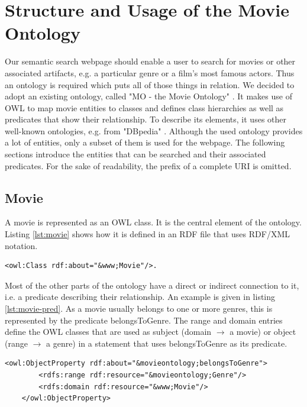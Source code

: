 \section{Structure and Usage of the Movie Ontology}
Our semantic search webpage should enable a user to search for movies or other associated artifacts, e.g. a particular genre or a film's most famous actors. Thus an ontology is required which puts all of those things in relation. We decided to adopt an existing ontology, called "MO - the Movie Ontology" \cite{bouza:movieontology}. It makes use of OWL to map movie entities to classes and defines class hierarchies as well as predicates that show their relationship. To describe its elements, it uses other well-known ontologies, e.g. from "DBpedia" \cite{dbpedia-swj}. Although the used ontology provides a lot of entities, only a subset of them is used for the webpage. The following sections introduce the entities that can be searched and their associated predicates. For the sake of readability, the prefix of a complete URI is omitted.

\subsection{Movie}
A movie is represented as an OWL class. It is the central element of the ontology. Listing \ref{lst:movie} shows how it is defined in an RDF file that uses RDF/XML notation.

\begin{lstlisting}[caption={OWL Movie Class in RDF/XML notation},label={lst:movie}]
<owl:Class rdf:about="&www;Movie"/>.
\end{lstlisting}

Most of the other parts of the ontology have a direct or indirect connection to it, i.e. a predicate describing their relationship. An example is given in listing \ref{lst:movie-pred}. As a movie usually belongs to one or more genres, this is represented by the predicate belongsToGenre. The range and domain entries define the OWL classes that are used as subject (domain $\rightarrow$ a movie) or object (range $\rightarrow$ a genre) in a statement that uses belongsToGenre as its predicate.

\begin{lstlisting}[caption={Exemplary Movie predicate in RDF/XML notation},label={lst:movie-pred}]
<owl:ObjectProperty rdf:about="&movieontology;belongsToGenre">
        <rdfs:range rdf:resource="&movieontology;Genre"/>
        <rdfs:domain rdf:resource="&www;Movie"/>
    </owl:ObjectProperty>
\end{lstlisting}


